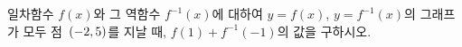 일차함수 $f(x)$와 그 역함수 $f^{-1}(x)$에 대하여 $y=f(x)$, $y=f^{-1}(x)$의 그래프가 모두 점~$(-2{,}\mkern3mu\mathopen{}5)$를 지날 때, $f(1)+f^{-1}(-1)$의 값을 구하시오.
